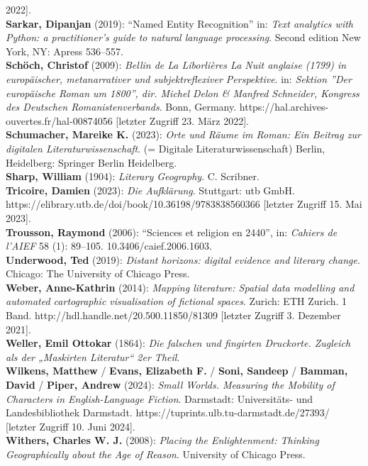 \documentclass[
  12pt,
  letterpaper,
  DIV=11,
  numbers=noendperiod]{scrreprt}
\begin{document}
2022{]}.\\
\textbf{Sarkar, Dipanjan} (2019): ``Named Entity Recognition'' in:
\emph{Text analytics with Python: a practitioner's guide to natural
language processing}. Second edition New York, NY: Apress 536--557.\\
\textbf{Schöch, Christof} (2009): \emph{Bellin de La Liborlières La Nuit
anglaise (1799) in europäischer, metanarrativer und subjektreflexiver
Perspektive}. in: \emph{Sektion ''Der europäische Roman um 1800'', dir.
Michel Delon \& Manfred Schneider, Kongress des Deutschen
Romanistenverbands}. Bonn, Germany.
https://hal.archives-ouvertes.fr/hal-00874056 {[}letzter Zugriff 23.
März 2022{]}.\\
\textbf{Schumacher, Mareike K.} (2023): \emph{Orte und Räume im Roman:
Ein Beitrag zur digitalen Literaturwissenschaft}. (= Digitale
Literaturwissenschaft) Berlin, Heidelberg: Springer Berlin Heidelberg.\\
\textbf{Sharp, William} (1904): \emph{Literary Geography}. C.
Scribner.\\
\textbf{Tricoire, Damien} (2023): \emph{Die Aufklärung}. Stuttgart: utb
GmbH. https://elibrary.utb.de/doi/book/10.36198/9783838560366 {[}letzter
Zugriff 15. Mai 2023{]}.\\
\textbf{Trousson, Raymond} (2006): ``Sciences et religion en 2440'', in:
\emph{Cahiers de l'AIEF} 58 (1): 89--105. 10.3406/caief.2006.1603.\\
\textbf{Underwood, Ted} (2019): \emph{Distant horizons: digital evidence
and literary change}. Chicago: The University of Chicago Press.\\
\textbf{Weber, Anne-Kathrin} (2014): \emph{Mapping literature: Spatial
data modelling and automated cartographic visualisation of fictional
spaces}. Zurich: ETH Zurich. 1 Band.
http://hdl.handle.net/20.500.11850/81309 {[}letzter Zugriff 3. Dezember
2021{]}.\\
\textbf{Weller, Emil Ottokar} (1864): \emph{Die falschen und fingirten
Druckorte. Zugleich als der „Maskirten Literatur`` 2er Theil}.\\
\textbf{Wilkens, Matthew} / \textbf{Evans, Elizabeth F.} / \textbf{Soni,
Sandeep} / \textbf{Bamman, David} / \textbf{Piper, Andrew} (2024):
\emph{Small Worlds. Measuring the Mobility of Characters in
English-Language Fiction}. Darmstadt: Universitäts- und Landesbibliothek
Darmstadt. https://tuprints.ulb.tu-darmstadt.de/27393/ {[}letzter
Zugriff 10. Juni 2024{]}.\\
\textbf{Withers, Charles W. J.} (2008): \emph{Placing the Enlightenment:
Thinking Geographically about the Age of Reason}. University of Chicago
Press.
\end{document}
